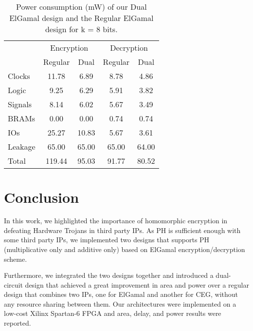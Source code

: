 \documentclass[conference]{IEEEtran}
\begin{document}
\begin{table}[t]
  \centering
  \caption{Power consumption (mW) of our Dual ElGamal design and the Regular ElGamal design for k = 8 bits.}
    \tabcolsep=0.11cm 
\begin{tabular}{|l||c|c||c|c|}
    \toprule
                    & \multicolumn{2}{c}{Encryption }  & \multicolumn{2}{c}{Decryption} \vline \\
                    & Regular & Dual    & Regular & Dual \\
\midrule
	 Clocks  & 11.78 & 6.89 & 8.78 & 4.86 \\
    Logic   & 9.25 & 6.29 & 5.91 & 3.82 \\
    Signals & 8.14 & 6.02 & 5.67 & 3.49 \\
    BRAMs   & 0.00 & 0.00 & 0.74 & 0.74 \\
    IOs     & 25.27 & 10.83 & 5.67 & 3.61 \\
    Leakage & 65.00 & 65.00 & 65.00 & 64.00 \\
    \midrule
    Total   & 119.44 & 95.03 & 91.77 & 80.52 \\
    \bottomrule 
    \end{tabular}\label{tab:FullPower}\end{table}

\section{Conclusion} \label{sec:conc}

In this work, we highlighted the importance of homomorphic encryption in defeating Hardware Trojans in third party IPs. As PH is sufficient enough with some third party IPs, we implemented two designs that supports PH (multiplicative only and additive only) based on ElGamal encryption/decryption scheme. 

Furthermore, we integrated the two designs together and introduced a dual-circuit design that achieved a great improvement in area and power over a regular design that combines two IPs, one for ElGamal and another for CEG, without any resource sharing between them. Our architectures were implemented on a low-cost Xilinx Spartan-6 FPGA and area, delay, and power results were reported. 



\end{document}

